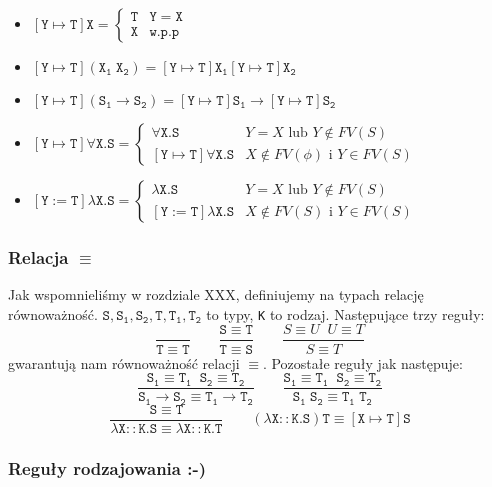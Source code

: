 \documentclass[11pt,leqno]{article}
\begin{document}
    \begin{itemize}
        \item $\mathtt{[Y \mapsto T]X = \begin{cases}  \texttt{T} & Y=X \\ \texttt{X} & \text{w.p.p} \end{cases}}$
        \item $\mathtt{[Y \mapsto T](X_1 \; X_2)  = [Y \mapsto T]X_1 [Y \mapsto T] X_2 }$
        \item $\mathtt{[Y \mapsto T](S_1 \rightarrow S_2) = [Y \mapsto T]S_1 \rightarrow [Y \mapsto T]S_2} $
        \item $\mathtt{[Y \mapsto T]\forall X.S}  = \begin{cases} \mathtt{\forall X.S} & Y=X \text{ lub } Y \notin FV(S) \\ \mathtt{[Y \mapsto T]\forall X.S} & X \notin FV(\phi)  \text{ i } Y \in FV(S) \end{cases}$
        \item $\mathtt{[Y := T]\lambda X.S }= \begin{cases} \mathtt{\lambda X.S} & Y=X \text{ lub } Y \notin FV(S)\\ \mathtt{[Y := T]\lambda X.S}  & X \notin FV(S)  \text{ i } Y \in FV(S) \end{cases}$
    \end{itemize}

\subsubsection{Relacja $\equiv$}

Jak wspomnieliśmy w rozdziale XXX, definiujemy na typach relację równoważność. $\mathtt{S,S_1,S_2,T,T_1,T_2}$ to typy, \texttt{K} to rodzaj. Następujące trzy reguły:
	\[\mathtt{
		\frac{}{T \equiv T}
                \qquad
                \frac{S \equiv T}{T \equiv S}}
                \qquad
                \frac{S \equiv U \;\; U \equiv T}{S \equiv T}
	\]
gwarantują nam równoważność relacji $\equiv$. Pozostałe reguły jak następuje:
	\[\mathtt{
		\frac{S_1 \equiv T_1 \;\; S_2 \equiv T_2}{S_1 \rightarrow S_2 \equiv T_1 \rightarrow T_2}
                \qquad
                \frac{S_1 \equiv T_1 \;\; S_2 \equiv T_2}{S_1\;S_2 \equiv T_1\;T_2}}
	\]
	\[\mathtt{
		\frac{S \equiv T}{\lambda X::K.S \equiv \lambda X::K.T}
                \qquad
                (\lambda X::K.S)T \equiv [X \mapsto T]S}
	\]

\subsubsection{Reguły rodzajowania :-)}
\end{document}
